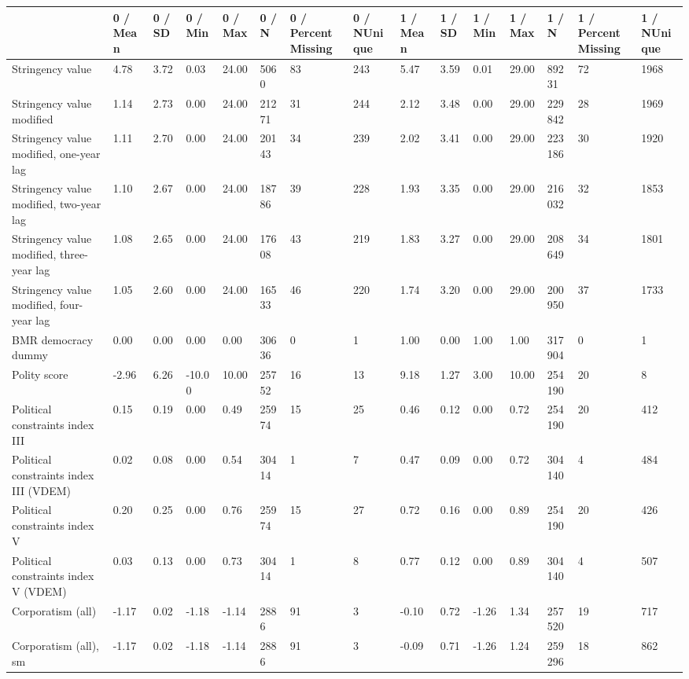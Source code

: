 
\begin{longtable}{lllllllllllllll}
\toprule
  & 0 / Mean & 0 / SD & 0 / Min & 0 / Max & 0 / N & 0 / PercentMissing & 0 / NUnique & 1 / Mean & 1 / SD & 1 / Min & 1 / Max & 1 / N & 1 / PercentMissing & 1 / NUnique\\
\midrule
Stringency value & 4.78 & 3.72 & 0.03 & 24.00 & 5060 & 83 & 243 & 5.47 & 3.59 & 0.01 & 29.00 & 89231 & 72 & 1968\\
Stringency value modified & 1.14 & 2.73 & 0.00 & 24.00 & 21271 & 31 & 244 & 2.12 & 3.48 & 0.00 & 29.00 & 229842 & 28 & 1969\\
Stringency value modified, one-year lag & 1.11 & 2.70 & 0.00 & 24.00 & 20143 & 34 & 239 & 2.02 & 3.41 & 0.00 & 29.00 & 223186 & 30 & 1920\\
Stringency value modified, two-year lag & 1.10 & 2.67 & 0.00 & 24.00 & 18786 & 39 & 228 & 1.93 & 3.35 & 0.00 & 29.00 & 216032 & 32 & 1853\\
Stringency value modified, three-year lag & 1.08 & 2.65 & 0.00 & 24.00 & 17608 & 43 & 219 & 1.83 & 3.27 & 0.00 & 29.00 & 208649 & 34 & 1801\\
\addlinespace
Stringency value modified, four-year lag & 1.05 & 2.60 & 0.00 & 24.00 & 16533 & 46 & 220 & 1.74 & 3.20 & 0.00 & 29.00 & 200950 & 37 & 1733\\
BMR democracy dummy & 0.00 & 0.00 & 0.00 & 0.00 & 30636 & 0 & 1 & 1.00 & 0.00 & 1.00 & 1.00 & 317904 & 0 & 1\\
Polity score & -2.96 & 6.26 & -10.00 & 10.00 & 25752 & 16 & 13 & 9.18 & 1.27 & 3.00 & 10.00 & 254190 & 20 & 8\\
Political constraints index III & 0.15 & 0.19 & 0.00 & 0.49 & 25974 & 15 & 25 & 0.46 & 0.12 & 0.00 & 0.72 & 254190 & 20 & 412\\
Political constraints index III (VDEM) & 0.02 & 0.08 & 0.00 & 0.54 & 30414 & 1 & 7 & 0.47 & 0.09 & 0.00 & 0.72 & 304140 & 4 & 484\\
\addlinespace
Political constraints index V & 0.20 & 0.25 & 0.00 & 0.76 & 25974 & 15 & 27 & 0.72 & 0.16 & 0.00 & 0.89 & 254190 & 20 & 426\\
Political constraints index V (VDEM) & 0.03 & 0.13 & 0.00 & 0.73 & 30414 & 1 & 8 & 0.77 & 0.12 & 0.00 & 0.89 & 304140 & 4 & 507\\
Corporatism (all) & -1.17 & 0.02 & -1.18 & -1.14 & 2886 & 91 & 3 & -0.10 & 0.72 & -1.26 & 1.34 & 257520 & 19 & 717\\
Corporatism (all), sm & -1.17 & 0.02 & -1.18 & -1.14 & 2886 & 91 & 3 & -0.09 & 0.71 & -1.26 & 1.24 & 259296 & 18 & 862\\

\end{longtable}
